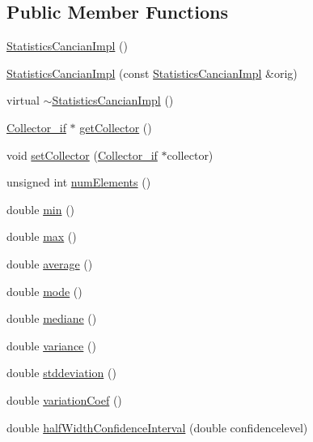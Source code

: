 \subsection*{Public Member Functions}
\begin{DoxyCompactItemize}
\item 
\hyperlink{class_statistics_cancian_impl_ad74dacaf522864b611472ab63ea001e8}{Statistics\-Cancian\-Impl} ()
\item 
\hyperlink{class_statistics_cancian_impl_a8fb61a145dabd401b99bc5e2c19a42b6}{Statistics\-Cancian\-Impl} (const \hyperlink{class_statistics_cancian_impl}{Statistics\-Cancian\-Impl} \&orig)
\item 
virtual \hyperlink{class_statistics_cancian_impl_ade6e0ebf0e8b76c3ffc00da584a2d64d}{$\sim$\-Statistics\-Cancian\-Impl} ()
\item 
\hyperlink{class_collector__if}{Collector\-\_\-if} $\ast$ \hyperlink{class_statistics_cancian_impl_ab255391ad55fada9f781933d2f791970}{get\-Collector} ()
\item 
void \hyperlink{class_statistics_cancian_impl_adbbf4036ba04976819af9bb104988b11}{set\-Collector} (\hyperlink{class_collector__if}{Collector\-\_\-if} $\ast$collector)
\item 
unsigned int \hyperlink{class_statistics_cancian_impl_a1d2fe0fe83fc07eb0521b76fbfd7c49b}{num\-Elements} ()
\item 
double \hyperlink{class_statistics_cancian_impl_a3ab4844399b479aa3cb18dfe41b8e776}{min} ()
\item 
double \hyperlink{class_statistics_cancian_impl_a3bfd053fdffa3fd7cbb4246b40503a8a}{max} ()
\item 
double \hyperlink{class_statistics_cancian_impl_ac1fd3ea442b571b7399e2b24106f66d2}{average} ()
\item 
double \hyperlink{class_statistics_cancian_impl_a8255541bdf60880cad08fecfb2e51349}{mode} ()
\item 
double \hyperlink{class_statistics_cancian_impl_aa57086cacb75c3a85cebd6d3d5c47053}{mediane} ()
\item 
double \hyperlink{class_statistics_cancian_impl_a8c4044fab2d60ab1855a73e43bae84a5}{variance} ()
\item 
double \hyperlink{class_statistics_cancian_impl_a2caa83257f21643b5fb8ccf4255c9f32}{stddeviation} ()
\item 
double \hyperlink{class_statistics_cancian_impl_a6e3a2bdd9a19d464a97d5bfb2f38cc6e}{variation\-Coef} ()
\item 
double \hyperlink{class_statistics_cancian_impl_a79b4ef1179bf3211ad65db76d6bbb514}{half\-Width\-Confidence\-Interval} (double confidencelevel)

\end{DoxyCompactItemize}
